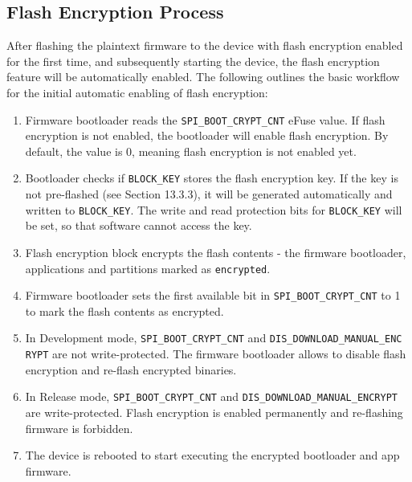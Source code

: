 \documentclass[a4paper,12pt]{book}
\begin{document}
\subsection{Flash Encryption Process}
After flashing the plaintext firmware to the device with flash encryption enabled for the first time, and subsequently starting the device, the flash encryption feature will be automatically enabled. The following outlines the basic workflow for the initial automatic enabling of flash encryption:

\begin{enumerate}[label=(\arabic*)]
    \item Firmware bootloader reads the \verb|SPI_BOOT_CRYPT_CNT| eFuse value. If flash encryption is not enabled, the bootloader will enable flash encryption. By default, the value is 0, meaning flash encryption is not enabled yet.
    \item Bootloader checks if \verb|BLOCK_KEY| stores the flash encryption key. If the key is not pre-flashed (see Section 13.3.3), it will be generated automatically and written to \verb|BLOCK_KEY|. The write and read protection bits for \verb|BLOCK_KEY| will be set, so that software cannot access the key.
    \item Flash encryption block encrypts the flash contents - the firmware bootloader, applications and partitions marked as \verb|encrypted|.
    \item Firmware bootloader sets the first available bit in \verb|SPI_BOOT_CRYPT_CNT| to 1 to mark the flash contents as encrypted.
    \item In Development mode, \verb|SPI_BOOT_CRYPT_CNT| and \verb|DIS_DOWNLOAD_MANUAL_ENC|\\ \verb|RYPT| are not write-protected. The firmware bootloader allows to disable flash encryption and re-flash encrypted binaries.
    \item In Release mode, \verb|SPI_BOOT_CRYPT_CNT| and \verb|DIS_DOWNLOAD_MANUAL_ENCRYPT| are write-protected. Flash encryption is enabled permanently and re-flashing firmware is forbidden.
    \item The device is rebooted to start executing the encrypted bootloader and app firmware.
\end{enumerate}

\end{document}
